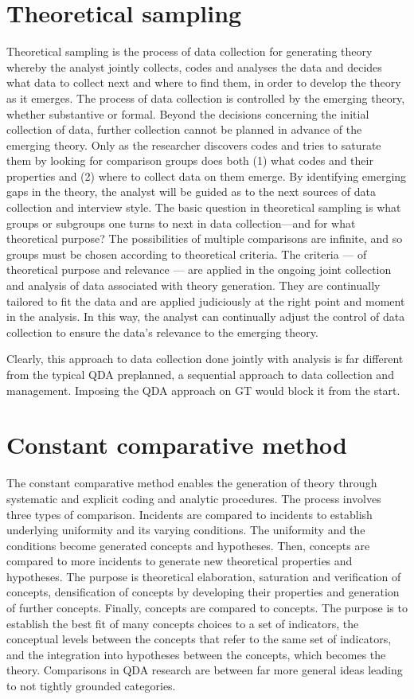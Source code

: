 \section*{Theoretical sampling}

Theoretical sampling is the process of data collection for generating theory whereby the analyst jointly collects, 
codes and analyses the data and decides what data to collect next and where to find them, 
in order to develop the theory as it emerges. 
The process of data collection is controlled by the emerging theory, 
whether substantive or formal. 
Beyond the decisions concerning the initial collection of data, 
further collection cannot be planned in advance of the emerging theory. 
Only as the researcher discovers codes and tries to saturate them by looking for comparison groups does both 
(1) what codes and their properties and 
(2) where to collect data on them emerge. 
By identifying emerging gaps in the theory, 
the analyst will be guided as to the next sources of data collection and interview style. 
The basic question in theoretical sampling is what groups or subgroups one turns to next in data collection—and for what theoretical purpose? 
The possibilities of multiple comparisons are infinite, and so groups must be chosen according to theoretical criteria. 
The criteria --- of theoretical purpose and relevance --- are applied in the ongoing joint collection and analysis of data associated with theory generation. 
They are continually tailored to fit the data and are applied judiciously at the right point and moment in the analysis. 
In this way, the analyst can continually adjust the control of data collection to ensure the data’s relevance to the emerging theory.

Clearly, this approach to data collection done jointly with analysis is far different from the typical QDA preplanned, 
a sequential approach to data collection and management. 
Imposing the QDA approach on GT would block it from the start.

\section*{Constant comparative method}

The constant comparative method enables the generation of theory through systematic and explicit coding and analytic procedures. 
The process involves three types of comparison. 
Incidents are compared to incidents to establish underlying uniformity and its varying conditions. 
The uniformity and the conditions become generated concepts and hypotheses. 
Then, concepts are compared to more incidents to generate new theoretical properties and hypotheses. 
The purpose is theoretical elaboration, 
saturation and verification of concepts, 
densification of concepts by developing their properties and generation of further concepts. 
Finally, concepts are compared to concepts. 
The purpose is to establish the best fit of many concepts choices to a set of indicators, the conceptual levels between the concepts that refer to the same set of indicators, and the integration into hypotheses between the concepts, which becomes the theory. 
Comparisons in QDA research are between far more general ideas leading to not tightly grounded categories.

